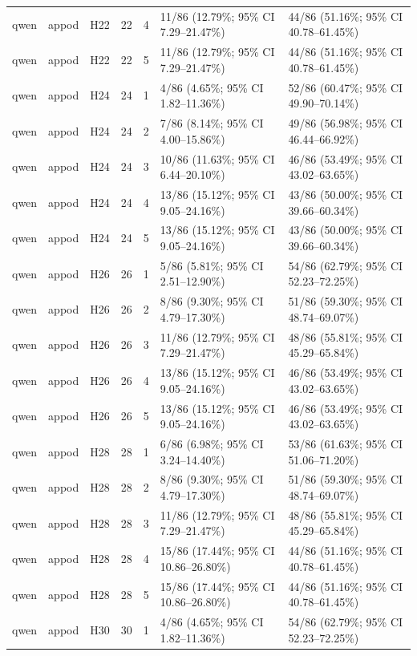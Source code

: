 \begin{longtable}{lllrrll}
qwen & appod & H22 & 22 & 4 & 11/86 (12.79\%; 95\% CI 7.29–21.47\%) & 44/86 (51.16\%; 95\% CI 40.78–61.45\%) \\
qwen & appod & H22 & 22 & 5 & 11/86 (12.79\%; 95\% CI 7.29–21.47\%) & 44/86 (51.16\%; 95\% CI 40.78–61.45\%) \\
qwen & appod & H24 & 24 & 1 & 4/86 (4.65\%; 95\% CI 1.82–11.36\%) & 52/86 (60.47\%; 95\% CI 49.90–70.14\%) \\
qwen & appod & H24 & 24 & 2 & 7/86 (8.14\%; 95\% CI 4.00–15.86\%) & 49/86 (56.98\%; 95\% CI 46.44–66.92\%) \\
qwen & appod & H24 & 24 & 3 & 10/86 (11.63\%; 95\% CI 6.44–20.10\%) & 46/86 (53.49\%; 95\% CI 43.02–63.65\%) \\
qwen & appod & H24 & 24 & 4 & 13/86 (15.12\%; 95\% CI 9.05–24.16\%) & 43/86 (50.00\%; 95\% CI 39.66–60.34\%) \\
qwen & appod & H24 & 24 & 5 & 13/86 (15.12\%; 95\% CI 9.05–24.16\%) & 43/86 (50.00\%; 95\% CI 39.66–60.34\%) \\
qwen & appod & H26 & 26 & 1 & 5/86 (5.81\%; 95\% CI 2.51–12.90\%) & 54/86 (62.79\%; 95\% CI 52.23–72.25\%) \\
qwen & appod & H26 & 26 & 2 & 8/86 (9.30\%; 95\% CI 4.79–17.30\%) & 51/86 (59.30\%; 95\% CI 48.74–69.07\%) \\
qwen & appod & H26 & 26 & 3 & 11/86 (12.79\%; 95\% CI 7.29–21.47\%) & 48/86 (55.81\%; 95\% CI 45.29–65.84\%) \\
qwen & appod & H26 & 26 & 4 & 13/86 (15.12\%; 95\% CI 9.05–24.16\%) & 46/86 (53.49\%; 95\% CI 43.02–63.65\%) \\
qwen & appod & H26 & 26 & 5 & 13/86 (15.12\%; 95\% CI 9.05–24.16\%) & 46/86 (53.49\%; 95\% CI 43.02–63.65\%) \\
qwen & appod & H28 & 28 & 1 & 6/86 (6.98\%; 95\% CI 3.24–14.40\%) & 53/86 (61.63\%; 95\% CI 51.06–71.20\%) \\
qwen & appod & H28 & 28 & 2 & 8/86 (9.30\%; 95\% CI 4.79–17.30\%) & 51/86 (59.30\%; 95\% CI 48.74–69.07\%) \\
qwen & appod & H28 & 28 & 3 & 11/86 (12.79\%; 95\% CI 7.29–21.47\%) & 48/86 (55.81\%; 95\% CI 45.29–65.84\%) \\
qwen & appod & H28 & 28 & 4 & 15/86 (17.44\%; 95\% CI 10.86–26.80\%) & 44/86 (51.16\%; 95\% CI 40.78–61.45\%) \\
qwen & appod & H28 & 28 & 5 & 15/86 (17.44\%; 95\% CI 10.86–26.80\%) & 44/86 (51.16\%; 95\% CI 40.78–61.45\%) \\
qwen & appod & H30 & 30 & 1 & 4/86 (4.65\%; 95\% CI 1.82–11.36\%) & 54/86 (62.79\%; 95\% CI 52.23–72.25\%) \\

\end{longtable}
